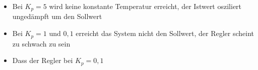 \documentclass[compress,11pt]{beamer}
\begin{document}
\begin{frame}
\begin{itemize}
\item Bei $K_p = 5$ wird keine konstante Temperatur erreicht, der Istwert osziliert ungedämpft um den Sollwert
\item Bei $K_p = 1$ und $0,1$ erreicht das System nicht den Sollwert, der Regler scheint zu schwach zu sein
\item Dass der Regler bei $K_p = 0,1$ 
\end{itemize}
\end{frame}
\end{document}
